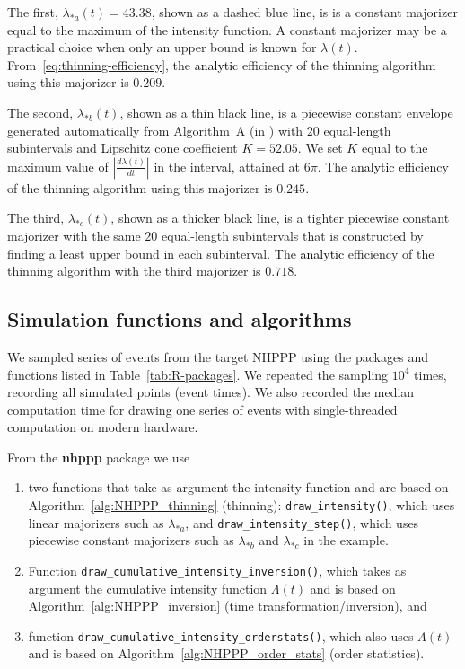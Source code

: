 \documentclass[10pt,letterpaper]{article}
\newcommand{\pkg}[1]{{\bf #1}}
\newcommand{\fct}[1]{\texttt{#1()}}
\newcommand{\der}[2]{\frac{d {#1}} {d{#2}}}
\newcommand{\red}[1]{\textcolor{black}{#1}}
\begin{document}
The first, $\lambda_{*a}(t) = 43.38$, shown as a dashed blue line, is is a constant majorizer equal to the maximum of the intensity function. A constant majorizer may be a practical choice when only an upper bound is known for $\lambda(t)$.
From~\eqref{eq:thinning-efficiency}, the \red{analytic} efficiency of the thinning algorithm using this majorizer is
$0.209$.

The second, $\lambda_{*b}(t)$, shown as a thin black line, is a piecewise constant envelope generated automatically from Algorithm~A %
(in ) with $20$ equal-length subintervals and Lipschitz cone coefficient ${K = 52.05}$. We set $K$ equal to the maximum value of $|\der{\lambda(t)}{t}|$ in the interval, attained at $6\pi$.
The \red{analytic} efficiency of the thinning algorithm using this majorizer is
$0.245$.

The third, $\lambda_{*c}(t)$, shown as a thicker black line, is a tighter piecewise constant majorizer with the same $20$ equal-length subintervals that is constructed by finding a least upper bound in each subinterval. The \red{analytic} efficiency of the thinning algorithm with the third
majorizer is
$0.718$.

\subsection{Simulation functions and algorithms}\label{sec:methods-sim}

We sampled series of events from the target NHPPP using the packages and functions listed in Table~\ref{tab:R-packages}. We repeated the sampling $\ensuremath{10^{4}}$ times, recording all simulated points (event times). We also recorded the median computation time for drawing one series of events with single-threaded computation on modern hardware.

From the \pkg{nhppp} package we use
\begin{enumerate}
\item  two functions that take as argument the intensity function and are based on Algorithm~\ref{alg:NHPPP_thinning} (thinning): \fct{draw\_intensity}, which uses linear majorizers such as $\lambda_{*a}$, and \fct{draw\_intensity\_step}, which uses piecewise constant majorizers such as $\lambda_{*b}$ and $\lambda_{*c}$ in the example.
\item  Function \fct{draw\_cumulative\_intensity\_inversion}, which takes as argument the cumulative intensity function $\Lambda(t)$ and is based on Algorithm~\ref{alg:NHPPP_inversion} (time transformation/inversion), and
\item  function \fct{draw\_cumulative\_intensity\_orderstats}, which also uses $\Lambda(t)$ and is based on Algorithm~\ref{alg:NHPPP_order_stats} (order statistics).
\end{enumerate}
\end{document}
